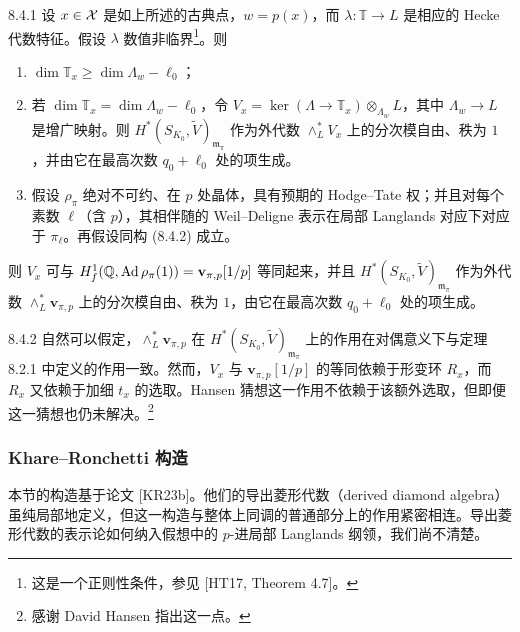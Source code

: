 \begin{thm}{8.4.1}\label{thm:a6-06-1}
设 $x\in\mathcal{X}$ 是如上所述的古典点，$w=p(x)$，而 $\lambda:\mathbb T\to L$ 是相应的 Hecke 代数特征。假设 $\lambda$ 数值非临界\footnote{这是一个正则性条件，参见 [HT17, Theorem 4.7]。}。则
\begin{enumerate}[(1)]
\item $\dim\mathbb T_x\ge\dim\Lambda_w-\ell_0$；
\item 若 $\dim\mathbb T_x=\dim\Lambda_w-\ell_0$，令 $V_x=\ker(\Lambda\to\mathbb T_x)\otimes_{\Lambda_w}L$，其中 $\Lambda_w\to L$ 是增广映射。则 $H^*(S_{K_0},\tilde V)_{\mathfrak m_\pi}$ 作为外代数 $\wedge^*_LV_x$ 上的分次模自由、秩为 $1$，并由它在最高次数 $q_0+\ell_0$ 处的项生成。
\item 假设 $\rho_\pi$ 绝对不可约、在 $p$ 处晶体，具有预期的 Hodge–Tate 权；并且对每个素数 $\ell$（含 $p$），其相伴随的 Weil–Deligne 表示在局部 Langlands 对应下对应于 $\pi_\ell$。再假设同构 (8.4.2) 成立。
\end{enumerate}

则 $V_x$ 可与 $H^1_f(\mathbb{Q},\operatorname{Ad}\rho_\pi(1))=\mathbf v_{\pi,p}[1/p]$ 等同起来，并且 $H^*(S_{K_0},\tilde V)_{\mathfrak m_\pi}$ 作为外代数 $\wedge^*_L\mathbf v_{\pi,p}$ 上的分次模自由、秩为 $1$，由它在最高次数 $q_0+\ell_0$ 处的项生成。
\end{thm}

\begin{rem}{8.4.2}\label{thm:a6-06-2}
自然可以假定，$\wedge^*_L\mathbf v_{\pi,p}$ 在 $H^*(S_{K_0},\tilde V)_{\mathfrak m_\pi}$ 上的作用在对偶意义下与定理 8.2.1 中定义的作用一致。然而，$V_x$ 与 $\mathbf v_{\pi,p}[1/p]$ 的等同依赖于形变环 $R_x$，而 $R_x$ 又依赖于加细 $t_x$ 的选取。Hansen 猜想这一作用不依赖于该额外选取，但即便这一猜想也仍未解决。\footnote{感谢 David Hansen 指出这一点。}
\end{rem}

\subsubsection{Khare–Ronchetti 构造}

本节的构造基于论文 [KR23b]。他们的导出菱形代数（derived diamond algebra）虽纯局部地定义，但这一构造与整体上同调的普通部分上的作用紧密相连。导出菱形代数的表示论如何纳入假想中的 $p$-进局部 Langlands 纲领，我们尚不清楚。

